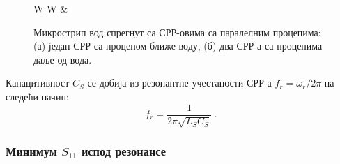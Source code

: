 \begin{figure}[!t]
\begin{tabular}{W W}
{    \label{f3c}} &
\end{tabular}
\caption{Микрострип вод спрегнут са СРР-овима са паралелним процепима: (а) један СРР са процепом ближе воду, (б) два СРР-а са процепима даље од вода.} 
\label{f3}
\end{figure}

Капацитивност $C_S$ се добија из резонантне учестаности СРР-а $f_r=\omega_r/2\pi$ на следећи начин:
\begin{equation}
f_r = \frac{1}{2\pi \sqrt{L_SC_S}}\;.
\end{equation}

\subsubsection{Минимум $S_{11}$ испод резонансе}

